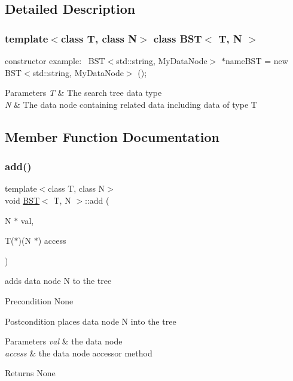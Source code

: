 \subsection{Detailed Description}
\subsubsection*{template$<$class T, class N$>$\newline
class B\+S\+T$<$ T, N $>$}

constructor example\+:~\newline
B\+S\+T$<$std\+::string, My\+Data\+Node$>$ $\ast$name\+B\+ST = new B\+S\+T$<$std\+::string, My\+Data\+Node$>$ (); 
\begin{DoxyParams}{Parameters}
{\em T} & The search tree data type \\
\hline
{\em N} & The data node containing related data including data of type T \\
\hline
\end{DoxyParams}


\subsection{Member Function Documentation}
\mbox{\label{class_b_s_t_afc990532c54fba36b8501836b1834ac6}} 
\subsubsection{\texorpdfstring{add()}{add()}}
{\footnotesize\ttfamily template$<$class T, class N$>$ \\
void \hyperlink{class_b_s_t}{B\+ST}$<$ T, N $>$\+::add (\begin{DoxyParamCaption}\item[{N $\ast$}]{val,  }\item[{T($\ast$)(N $\ast$)}]{access }\end{DoxyParamCaption})}

adds data node N to the tree \begin{DoxyPrecond}{Precondition}
None 
\end{DoxyPrecond}
\begin{DoxyPostcond}{Postcondition}
places data node N into the tree 
\end{DoxyPostcond}

\begin{DoxyParams}{Parameters}
{\em val} & the data node \\
\hline
{\em access} & the data node accessor method \\
\hline
\end{DoxyParams}
\begin{DoxyReturn}{Returns}
None 
\end{DoxyReturn}
\mbox{\label{class_b_s_t_a5b31797d590b06f6ed2c68fc6161510b}} 

